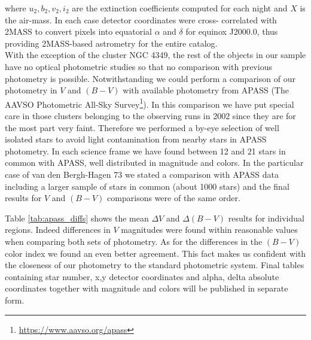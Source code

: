 \documentclass{aa}
\begin{document}
where $u_2, b_2, v_2, i_2$ are the extinction coefficients computed for each
night and $X$ is the air-mass. In each case detector coordinates were cross-
correlated with 2MASS \citep{2006AJ....131.1163S} to convert pixels into
equatorial $\alpha$ and $\delta$ for equinox J2000.0, thus providing 2MASS-based
astrometry for the entire catalog.\\

With the exception of the cluster NGC 4349, the rest of the objects in our
sample have no optical photometric studies so that no comparison with previous
photometry is possible. Notwithstanding we could perform a comparison of our
photometry in $V$ and $(B-V)$ with available photometry from APASS (The AAVSO
Photometric All-Sky Survey\footnote{\url{https://www.aavso.org/apass}}).
In this comparison we have put special care in
those clusters belonging to the observing runs in 2002 since they are for the
most part very faint. Therefore we performed a by-eye selection of well isolated
stars to avoid light contamination from nearby stars in APASS photometry. In
each science frame we have found between 12 and 21 stars in common with APASS,
well distributed in magnitude and colors. In the particular case of van den
Bergh-Hagen 73 we stated a comparison with APASS data including a larger sample
of stars in common (about 1000 stars) and the final results for $V$ and $(B-V)$
comparisons were of the same order.

Table \ref{tab:apass_diffs} shows the mean $\Delta V$ and $\Delta(B-V)$ results for
individual regions. Indeed differences in $V$ magnitudes were found within
reasonable values when comparing both sets of photometry. As for the differences
in the $(B-V)$ color index we found an even better agreement. This fact makes us
confident with the closeness of our photometry to the standard photometric
system. Final tables containing star number, x,y detector coordinates and alpha,
delta absolute coordinates together with magnitude and colors will be published
in separate form.
\end{document}

